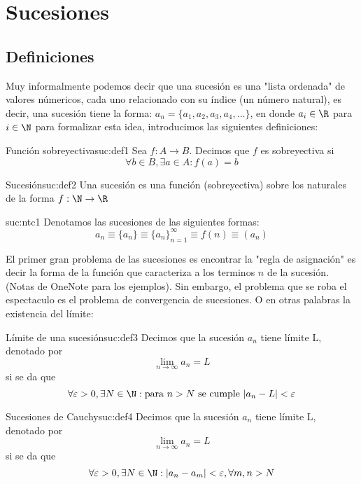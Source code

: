 \section{\Large Sucesiones}

\subsection{Definiciones}
Muy informalmente podemos decir que una sucesión es una "lista ordenada" de valores númericos, cada uno relacionado con su índice (un número natural), es decir, una sucesión tiene la forma: $a_n = \{a_1, a_2, a_3, a_4, ...\}$, en donde $a_i \in \R$ para $i \in \N$ para formalizar esta idea, introducimos las siguientes definiciones:

\begin{definicion}{Función sobreyectiva}{suc:def1}
    Sea $f: A \to B$. Decimos que $f$ es sobreyectiva si 
    \[
        \forall b \in B, \exists a \in A: f(a) = b
    \]
\end{definicion}

\begin{definicion}{Sucesión}{suc:def2}
    Una sucesión es una función (sobreyectiva) sobre los naturales de la forma $f: \N \to \R$ 
\end{definicion}

\begin{notacion}{}{suc:ntc1}
    Denotamos las sucesiones de las siguientes formas:
    \[ 
        a_n \equiv \{a_n\} \equiv \{a_n\}_{n = 1}^{\infty} \equiv f(n) \equiv (a_n)
    \]
\end{notacion}

El primer gran problema de las sucesiones es encontrar la "regla de asignación" es decir la forma de la función que caracteriza a los terminos $n$ de la sucesión. (Notas de OneNote para los ejemplos). Sin embargo, el problema que se roba el espectaculo es el problema de convergencia de sucesiones. O en otras palabras la existencia del límite: 
    
\begin{definicion}{Límite de una sucesión}{suc:def3}
    Decimos que la sucesión $a_n$ tiene límite L, denotado por
    \[ 
        \lim_{n \to \infty} a_n = L
    \]
    si se da que 
    \[ 
        \forall \varepsilon > 0, \exists N \in \N: \text{para } n > N \text{ se cumple } \lvert a_n - L \rvert < \varepsilon
    \]
\end{definicion}

\begin{definicion}{Sucesiones de Cauchy}{suc:def4}
    Decimos que la sucesión $a_n$ tiene límite L, denotado por
    \[ 
        \lim_{n \to \infty} a_n = L
    \]
    si se da que 
    \[ 
        \forall \varepsilon > 0, \exists N \in \N: \lvert a_n - a_m \rvert < \varepsilon, \forall m,n > N 
    \]
\end{definicion}

